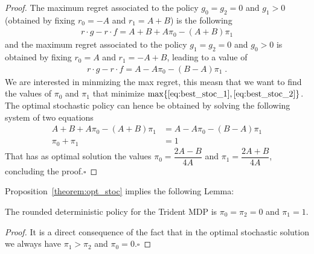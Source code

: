 \begin{proof}
The maximum regret associated to the policy $g_0=g_2=0$ and $g_1 > 0$  (obtained by fixing $r_0 = -A$ and $r_1 = A+B$) is the following
\begin{align}
r \cdot g - r \cdot f = A + B +A \pi_0 -(A+B)\pi_1 \label{eq:best_stoc_1}
\end{align}   
and the maximum regret associated to the policy $g_1=g_2=0$ and $g_0 > 0$ is obtained by fixing $r_0 = A$ and $r_1 = -A+B$, leading to a value of
\begin{align}
r \cdot g - r \cdot f = A - A \pi_0 -(B-A)\pi_1 \label{eq:best_stoc_2}\;.
\end{align}   
We are interested in minmizing the max regret, this measn that we want to find the values of $\pi_0$ and $\pi_1$ that minimize $\max \{\eqref{eq:best_stoc_1}, \eqref{eq:best_stoc_2}\}$. The optimal stochastic policy can hence be obtained by solving the following system of two equations 
\begin{align*}
A + B +A \pi_0 -(A+B)\pi_1 &= A - A \pi_0 -(B-A)\pi_1\\
\pi_0+\pi_1 &= 1
\end{align*} 
That has as optimal solution the values $\pi_{0}=\dfrac{2A - B}{4A}$ and $\pi_{1}=\dfrac{2A + B}{4A}$, concluding the proof.$\square$
\end{proof}


Proposition~\ref{theorem:opt_stoc} implies the following Lemma:
\begin{lemma}
The rounded deterministic policy for the Trident MDP is $\pi_0 =\pi_2 = 0$ and $\pi_1 = 1$.
\end{lemma}
\begin{proof}
It is a direct consequence of the fact that in the optimal stochastic solution we always have $\pi_1 > \pi_2$ and $\pi_0 = 0$.$\square$
\end{proof}



